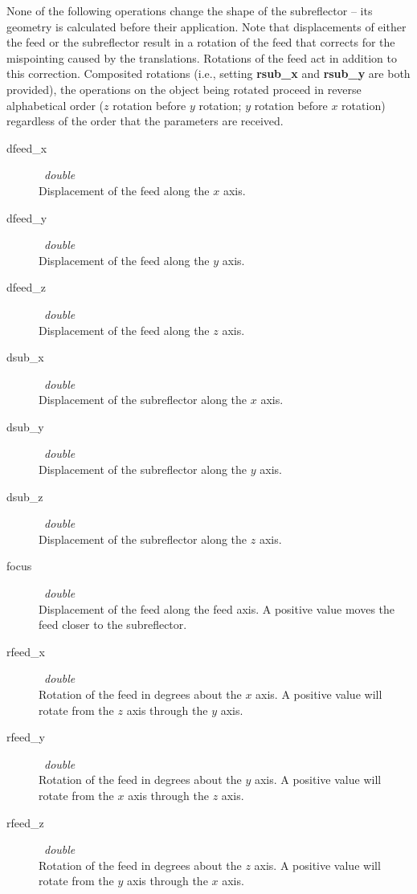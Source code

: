 \documentclass{article}
\begin{document}
None of the following operations change the shape of the subreflector -- its
geometry is calculated before their application.  Note that displacements
of either the feed or the subreflector result in a rotation of the feed
that corrects for the mispointing caused by the translations.  Rotations
of the feed act in addition to this correction.  Composited rotations (i.e.,
setting {\bf rsub\_x} and {\bf rsub\_y} are both provided), the operations
on the object being rotated proceed in reverse alphabetical order ($z$ 
rotation before $y$ rotation; $y$ rotation before $x$ rotation) regardless
of the order that the parameters are received.

\begin{description}
\item[dfeed\_x] \ {\it double} \\
Displacement of the feed along the $x$ axis.  
\item[dfeed\_y] \ {\it double} \\
Displacement of the feed along the $y$ axis.  
\item[dfeed\_z] \ {\it double} \\
Displacement of the feed along the $z$ axis.  
\item[dsub\_x] \ {\it double} \\
Displacement of the subreflector along the $x$ axis.
\item[dsub\_y] \ {\it double} \\
Displacement of the subreflector along the $y$ axis.
\item[dsub\_z] \ {\it double} \\
Displacement of the subreflector along the $z$ axis.
\item[focus] \ {\it double} \\
Displacement of the feed along the feed axis.  A positive value moves the
feed closer to the subreflector.
\item[rfeed\_x] \ {\it double} \\
Rotation of the feed in degrees about the $x$ axis.  A positive 
value will rotate from the $z$ axis through the $y$ axis.
\item[rfeed\_y] \ {\it double} \\
Rotation of the feed in degrees about the $y$ axis.  A positive 
value will rotate from the $x$ axis through the $z$ axis.
\item[rfeed\_z] \ {\it double} \\
Rotation of the feed in degrees about the $z$ axis.  A positive 
value will rotate from the $y$ axis through the $x$ axis.

\end{description}
\end{document}
